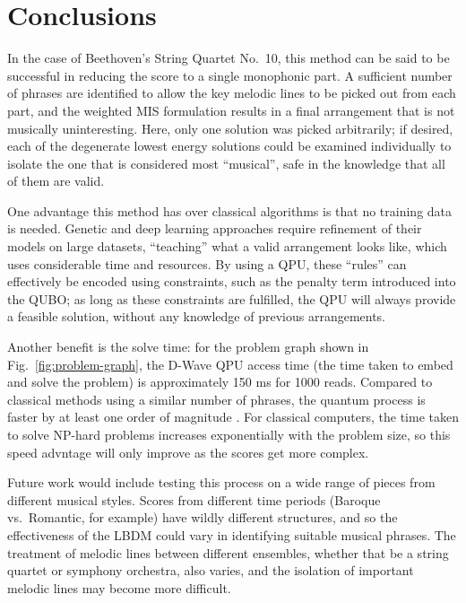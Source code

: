 \documentclass[aps,pra,10pt,twocolumn]{revtex4-2}
\begin{document}
\clearpage

\section{Conclusions}

In the case of Beethoven's String Quartet No.\ 10, this method can be said to be successful in reducing the score to a single monophonic part. A sufficient number of phrases are identified to allow the key melodic lines to be picked out from each part, and the weighted MIS formulation results in a final arrangement that is not musically uninteresting. Here, only one solution was picked arbitrarily; if desired, each of the degenerate lowest energy solutions could be examined individually to isolate the one that is considered most ``musical'', safe in the knowledge that all of them are valid.

One advantage this method has over classical algorithms is that no training data is needed. Genetic and deep learning approaches require refinement of their models on large datasets, ``teaching'' what a valid arrangement looks like, which uses considerable time and resources. By using a QPU, these ``rules'' can effectively be encoded using constraints, such as the penalty term introduced into the QUBO; as long as these constraints are fulfilled, the QPU will always provide a feasible solution, without any knowledge of previous arrangements.

Another benefit is the solve time: for the problem graph shown in Fig.\ \ref{fig:problem-graph}, the D-Wave QPU access time (the time taken to embed and solve the problem) is approximately \num{150} \unit{\ms} for 1000 reads. Compared to classical methods using a similar number of phrases, the quantum process is faster by at least one order of magnitude \cite{huang_towards_2012}. For classical computers, the time taken to solve NP-hard problems increases exponentially with the problem size, so this speed advntage will only improve as the scores get more complex.

Future work would include testing this process on a wide range of pieces from different musical styles. Scores from different time periods (Baroque vs.\ Romantic, for example) have wildly different structures, and so the effectiveness of the LBDM could vary in identifying suitable musical phrases. The treatment of melodic lines between different ensembles, whether that be a string quartet or symphony orchestra, also varies, and the isolation of important melodic lines may become more difficult.
\end{document}
